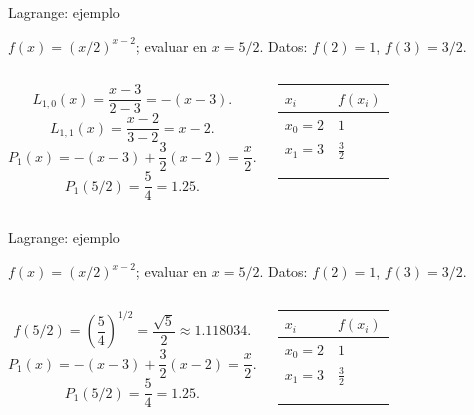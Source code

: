 \documentclass[main.tex]{subfiles}
\begin{document}
\begin{frame}[t]{Lagrange: ejemplo}
\par\noindent\begin{minipage}[t][7.5mm][t]{\textwidth}\small\strut $f(x)=(x/2)^{x-2}$; evaluar en $x=5/2$. Datos: $f(2)=1$, $f(3)=3/2$.\end{minipage}\par\nointerlineskip
\begin{columns}[T]\small\setlength{\abovedisplayskip}{4pt}\setlength{\belowdisplayskip}{4pt}\small\[L_{1,0}(x)=\frac{x-3}{2-3}=-(x-3).\]
\[L_{1,1}(x)=\frac{x-2}{3-2}=x-2.\]\[P_1(x)=-(x-3)+\frac32(x-2)=\frac{x}{2}.\]
\[P_1(5/2)=\frac54=1.25.\]\begingroup\small\setlength{\tabcolsep}{3pt}\begin{center}\begin{tabular}{|C{.42\textwidth}|C{.42\textwidth}|}\hline
\rule[-2mm]{0pt}{6mm}$x_i$&$f(x_i)$\\\hline
\rule[-2.5mm]{0pt}{6mm}$x_0=2$&$1$\\\hline
\rule[-2.5mm]{0pt}{6mm}$x_1=3$&$\frac{3}{2}$\\\hline
\rule[-2.5mm]{0pt}{6mm}&\\\hline
\rule[-2.5mm]{0pt}{6mm}&\\\hline
\rule[-2.5mm]{0pt}{6mm}&\\\hline
\end{tabular}\end{center}\endgroup\par
\end{columns}
\end{frame}
\begin{frame}[t]{Lagrange: ejemplo}
\par\noindent\begin{minipage}[t][7.5mm][t]{\textwidth}\small\strut $f(x)=(x/2)^{x-2}$; evaluar en $x=5/2$. Datos: $f(2)=1$, $f(3)=3/2$.\end{minipage}\par\nointerlineskip
\begin{columns}[T]\small\setlength{\abovedisplayskip}{4pt}\setlength{\belowdisplayskip}{4pt}\[f(5/2)=\left(\frac54\right)^{1/2}=\frac{\sqrt5}{2}\approx1.118034.\]\[P_1(x)=-(x-3)+\frac32(x-2)=\frac{x}{2}.\]
\[P_1(5/2)=\frac54=1.25.\]\begingroup\small\setlength{\tabcolsep}{3pt}\begin{center}\begin{tabular}{|C{.42\textwidth}|C{.42\textwidth}|}\hline
\rule[-2mm]{0pt}{6mm}$x_i$&$f(x_i)$\\\hline
\rule[-2.5mm]{0pt}{6mm}$x_0=2$&$1$\\\hline
\rule[-2.5mm]{0pt}{6mm}$x_1=3$&$\frac{3}{2}$\\\hline
\rule[-2.5mm]{0pt}{6mm}&\\\hline
\rule[-2.5mm]{0pt}{6mm}&\\\hline
\rule[-2.5mm]{0pt}{6mm}&\\\hline
\end{tabular}\end{center}\endgroup\par
\end{columns}
\end{frame}
\end{document}
